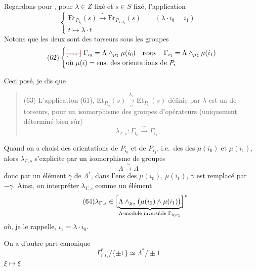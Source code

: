 \documentclass[11pt,a4paper]{article}
\begin{document}
Regardons pour , pour $\lambda\in Z$ fixé et $s\in S$ fixé, l'application
\[
\tag{61}
\begin{cases}
\mathrm{Et}_{P_{i_0}}(s) \xrightarrow{\ \sim\ } \mathrm{Et}_{P_{\lambda\cdot i_0}}(s)
\qquad (\lambda\cdot i_0 = i_1)\\
t \longmapsto \lambda\cdot t
\end{cases}
\]
Notons que les deux  sont des torseurs sous les groupes
\[
\tag{62}
\begin{cases}
\text{\struck{\ill{}}}\ \Gamma_{i_0} = \Lambda\wedge_{\mu_2}\mu(i_0)
\quad\text{resp.}\quad \Gamma_{i_1} = \Lambda\wedge_{\mu_2}\mu(i_1)\\
\text{où } \mu(i) = \text{ens.\ des orientations de } P_i
\end{cases}
\]

Ceci posé, je dis que
\begin{quote}
(63) L'application (61), $\mathrm{Et}_{P_{i_0}}(s) \xrightarrow[\sim]{\ \lambda_s\ } \mathrm{Et}_{P_{i_1}}(s)$
définie par $\lambda$ est un  de torseurs, pour un isomorphisme des
groupes d'opérateurs (uniquement déterminé bien sûr)
\[
\lambda_{\Gamma,s}\colon \Gamma_{i_0} \xrightarrow{\ \sim\ } \Gamma_{i_1},
\]
\end{quote}
Quand on a choisi des orientations de $P_{i_0}$ et de $P_{i_1}$, i.e.\ des 
des $\mu(i_0)$ et $\mu(i_1)$, alors $\lambda_{\Gamma,s}$ s'explicite par un isomorphisme de groupes
\[
\Lambda \xrightarrow{\ \sim\ } \Lambda
\]
donc par un élément $\gamma$ de $\Lambda^{*}$,  \struck{\ill{}} 
dans l'ens des \struck{\ill{}}  $\mu(i_0)$, $\mu(i_1)$, $\gamma$ est
remplacé par $-\gamma$. Ainsi, on  interpréter $\lambda_{\Gamma,s}$ comme un élément
\[
\tag{64}
\lambda_{\Gamma,s}\in
\Bigl[\underbrace{\Lambda\wedge_{\mu_2}\bigl(\mu(i_0)\wedge\mu(i_1)\bigr)}_{\Lambda\text{-module inversible } \Gamma_{i_0 i_1}}\Bigr]^{*}
\]
où, je le rappelle, $i_1 = \lambda\cdot i_0$.

On a d'autre part  
canonique
\[
\tag{65}
\Gamma_{i_0 i_1}^{*}/\{\pm1\} \simeq \Lambda^{*}/\pm1
\]
$\xi \longmapsto \xi$\ill{}
\end{document}
